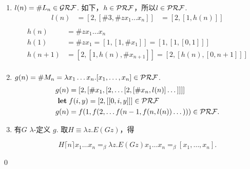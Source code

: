 \begin{pf} \rm 
   \begin{enumerate}
       \item $l(n) = \#L_n\in\mathcal{GRF}$. 如下，$h\in\mathcal{PRF}$，所以$l\in\mathcal{PRF}$.
    $$
    \begin{aligned}
        l(n) &= [2, [\#3, \#zx_1\dots x_n]] 
        &= [2, [1, h(n)]]\\
    \end{aligned}
    $$
    $$
    \begin{aligned}
        h(n) &= \#zx_1\dots x_n \\
        h(1) &= \# zx_1 = [1,[1,\#x_1]] = [1, [1, [0,1]]] \\   
        h(n+1) &= [2, [1, h(n), \#x_{n+1}]] = [2, [h(n), [0, n+1]]]\\
    \end{aligned}
    $$
    \item $g(n) = \#M_n = \lambda x_1\dots x_n. [x_1, \dots, x_n]\in\mathcal{PRF}$.
    $$
    \begin{aligned}
        g(n) &= [2, [\#x_1, [2, \dots [2, [\#x_n, l(n)]\dots]]]]\\
        \mathbf{let}\; &f(i, y) = [2, [[0, i, y]]]\in \mathcal{PRF}\\
        g(n) &= f(1, f(2, \dots f(n-1, f(n, l(n))\dots)))\in\mathcal{PRF}.
    \end{aligned}
    $$
    \item 有$G$ $\lambda$-定义 $g$. 取$H\equiv \lambda z.E(Gz)$，得
    
    $$H\lceil n\rceil x_1\dots x_n =_\beta \lambda z. E(Gz) x_1\dots x_n =_\beta [x_1, \dots, x_n].$$
   \end{enumerate}
   \qed
\end{pf}